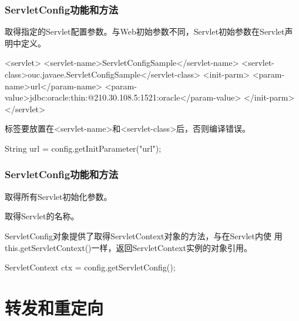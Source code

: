 \begin{frame}[fragile] %
  \frametitle{ServletConfig功能和方法} 


  取得指定的Servlet配置参数。与Web初始参数不同，Servlet初始参数在Servlet声明中定义。

  \begin{xmlCode}
    <servlet>  
      <servlet-name>ServletConfigSample</servlet-name>
      <servlet-class>ouc.javaee.ServletConfigSample</servlet-class>
      <init-parm>
        <param-name>url</param-name>
        <param-value>jdbc:oracle:thin:@210.30.108.5:1521:oracle</param-value>
      </init-parm>
    </servlet>  
  \end{xmlCode}

   {标签要放置在<servlet-name>和<servlet-class>后，否则编译错误。}

  
  \begin{javaCode}
    String url = config.getInitParameter("url");
  \end{javaCode}
\end{frame}

\begin{frame}[fragile] %
  \frametitle{ServletConfig功能和方法} 


  取得所有Servlet初始化参数。


  取得Servlet的名称。


{\kai ServletConfig对象提供了取得ServletContext对象的方法，与在Servlet内使
  用this.getServletContext()一样，返回ServletContext实例的对象引用。}

  \begin{javaCode}
    ServletContext ctx = config.getServletConfig();
  \end{javaCode}
\end{frame}

\section{转发和重定向}

